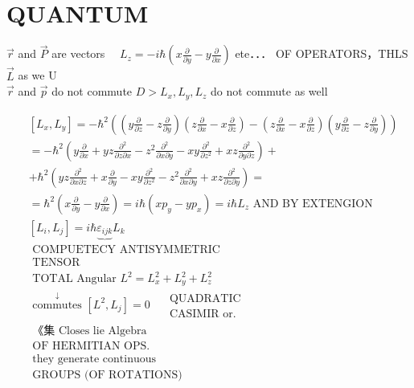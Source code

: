 \documentclass[10pt]{article}
\begin{document}
\section*{QUANTUM}
$\vec{r}$ and $\vec{P}$ are vectors $\quad L_{z}=-i \hbar\left(x \frac{\partial}{\partial y}-y \frac{\partial}{\partial x}\right)$ ete．．． OF OPERATORS，THLS\\
$\vec{L}$ as we U\\
$\vec{r}$ and $\vec{p}$ do not commute $D>L_{x}, L_{y}, L_{z}$ do not commute as well

$$
\begin{aligned}
& {\left[L_{x}, L_{y}\right]=-\hbar^{2}\left(\left(y \frac{\partial}{\partial z}-z \frac{\partial}{\partial y}\right)\left(z \frac{\partial}{\partial x}-x \frac{\partial}{\partial z}\right)-\left(z \frac{\partial}{\partial x}-x \frac{\partial}{\partial z}\right)\left(y \frac{\partial}{\partial z}-z \frac{\partial}{\partial y}\right)\right)} \\
& =-\hbar^{2}\left(y \frac{\partial}{\partial x}+y z \frac{\partial^{2}}{\partial z \partial x}-z^{2} \frac{\partial^{2}}{\partial x \partial y}-x y \frac{\partial^{2}}{\partial z^{2}}+x z \frac{\partial^{2}}{\partial y \partial z}\right)+ \\
& +\hbar^{2}\left(y z \frac{\partial^{2}}{\partial x \partial z}+x \frac{\partial}{\partial y}-x y \frac{\partial^{2}}{\partial z^{2}}-z^{2} \frac{\partial^{2}}{\partial x \partial y}+x z \frac{\partial^{2}}{\partial z \partial y}\right)= \\
& =\hbar^{2}\left(x \frac{\partial}{\partial y}-y \frac{\partial}{\partial x}\right)=i \hbar\left(x p_{y}-y p_{x}\right)=i \hbar L_{z} \text { AND BY EXTENGION } \\
& {\left[L_{i}, L_{j}\right]=i \hbar \underbrace{\varepsilon_{i j k}} L_{k}} \\
& \text { COMPUETECY ANTISYMMETRIC } \\
& \text { TENSOR } \\
& \text { TOTAL Angular } L^{2}=L_{x}^{2}+L_{y}^{2}+L_{z}^{2} \\
& \stackrel{\downarrow}{\text { commutes }}\left[L^{2}, L_{j}\right]=0 \quad \begin{array}{l}
\text { QUADRATIC } \\
\text { CASIMIR or. }
\end{array} \\
& \text { 《集 Closes lie Algebra } \\
& \text { OF HERMITIAN OPS. } \\
& \text { they generate continuous } \\
& \text { GROUPS (OF ROTATIONS) }
\end{aligned}
$$
\end{document}
